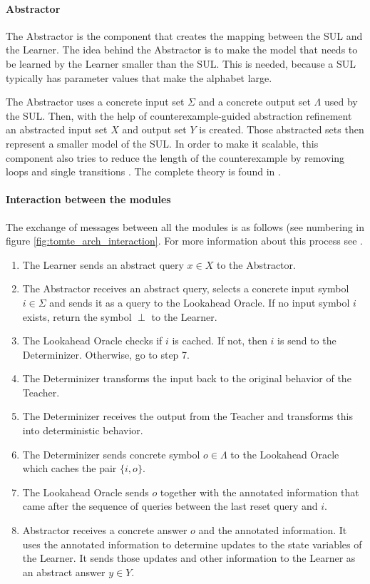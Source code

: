 \paragraph{Abstractor} The Abstractor is the component that creates the mapping
between the SUL and the Learner. The idea behind the Abstractor is to make the
model that needs to be learned by the Learner smaller than the SUL. This is
needed, because a SUL typically has parameter values that make the alphabet
large.

The Abstractor uses a concrete input set $\Sigma$ and a concrete
output set $\Lambda$ used by the SUL. Then, with the help of
counterexample-guided abstraction refinement\cite[p. 104]{Tomte2014} an
abstracted input set $X$ and output set $Y$ is created. Those abstracted sets
then represent a smaller model of the SUL. In order to make it scalable, this
component also tries to reduce the length of the counterexample by removing
loops and single transitions \cite{Koopman2014}. The complete theory is found
in \cite{Tomte2014}.

\paragraph{Interaction between the modules} The exchange of messages between
all the modules is as follows (see numbering in figure
\ref{fig:tomte_arch_interaction}. For more information about this process see
\cite{Aarts2015,Tomte2014}.

\begin{enumerate}
	\item The Learner sends an abstract query $x \in X$ to the Abstractor.
	\item The Abstractor receives an abstract query, selects a concrete input
	symbol $i \in \Sigma$ and sends it as a query to the Lookahead
	Oracle. If no input symbol $i$ exists, return the symbol $\perp$ to the
	Learner.
	\item The Lookahead Oracle checks if $i$ is cached. If not, then $i$ is send
	to the Determinizer. Otherwise, go to step 7.
	\item The Determinizer transforms the input back to the original behavior of
	the Teacher.
	\item The Determinizer receives the output from the Teacher and transforms
	this into deterministic behavior.
	\item The Determinizer sends concrete symbol $o \in \Lambda$ to the
	Lookahead Oracle which caches the pair $\{i,o\}$.
	\item The Lookahead Oracle sends $o$ together with the annotated information
	that came after the sequence of queries between the last reset query and
	$i$.
	\item Abstractor receives a concrete answer $o$ and the annotated
	information. It uses the annotated information to determine updates to the
	state variables of the Learner. It sends those updates and other
	information to the Learner as an abstract answer $y \in Y$.
\end{enumerate}

